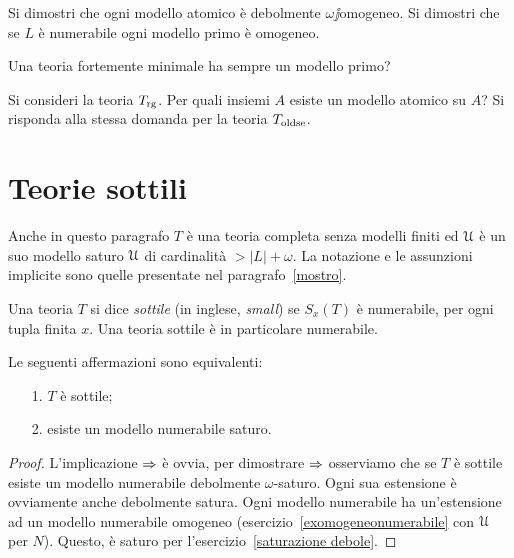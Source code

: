 \begin{exercise}
Si dimostri che ogni modello atomico \`e debolmente $\omega\jj$omogeneo. Si dimostri che se $L$ \`e numerabile ogni modello primo \`e omogeneo.\QED
\end{exercise}

\begin{exercise} 
Una teoria fortemente minimale ha sempre un modello primo?\QED
\end{exercise}

\begin{exercise}
Si consideri la teoria $T_{\rm rg}$. Per quali insiemi $A$ esiste un modello atomico su $A$? Si risponda alla stessa domanda per la teoria $T_{\rm oldse}$.\QED
\end{exercise}

\section{Teorie sottili}

Anche in  questo paragrafo $T$ \`e una teoria completa senza modelli finiti ed $\EuScript U$ \`e un suo modello saturo $\EuScript U$ di cardinalit\`a $>|L|+\omega$. La notazione e le assunzioni implicite sono quelle presentate nel paragrafo~\ref{mostro}.

Una teoria $T$ si dice \emph{sottile\/} (in inglese, \emph{small\/}) se $S_x(T)$ \`e numerabile, per ogni tupla finita $x$. Una teoria sottile \`e in particolare numerabile.

\begin{proposition}\label{prop_small_countable_saturated}
Le seguenti affermazioni sono equivalenti:
\begin{itemize}
\item[1.] $T$ \`e sottile;
\item[2.] esiste un modello numerabile saturo.
\end{itemize}
\end{proposition}
\begin{proof}
L'implicazione $\Rightarrow$ \`e ovvia, per dimostrare  $\Rightarrow$ osserviamo che se $T$ \`e sottile esiste un modello numerabile debolmente $\omega$-saturo. Ogni sua estensione \`e ovviamente anche  debolmente satura.  Ogni modello numerabile ha un'estensione ad un modello numerabile omogeneo (esercizio~\ref{exomogeneonumerabile} con $\EuScript U$ per $N$). Questo, \`e saturo per l'esercizio~\ref{saturazione debole}.
\end{proof}

